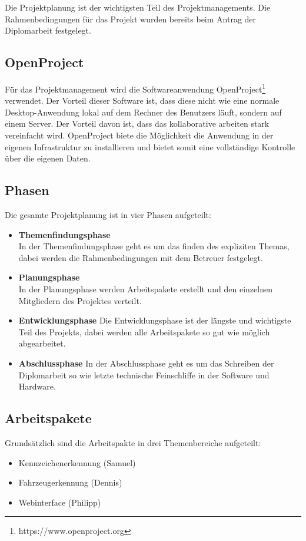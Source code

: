 Die Projektplanung ist der wichtigsten Teil des Projektmanagements. Die
Rahmenbedingungen für das Projekt wurden bereits beim Antrag der Diplomarbeit
festgelegt.

\subsection{OpenProject}
Für das Projektmanagement wird die Softwareanwendung
OpenProject\footnote{https://www.openproject.org} verwendet. Der Vorteil dieser
Software ist, dass diese nicht wie eine normale Desktop-Anwendung lokal auf dem
Rechner des Benutzers läuft, sondern auf einem Server. Der Vorteil davon ist,
dass das kollaborative arbeiten stark vereinfacht wird. OpenProject biete die
Möglichkeit die Anwendung in der eigenen Infrastruktur zu installieren und
bietet somit eine vollständige Kontrolle über die eigenen Daten.

\subsection{Phasen}
Die gesamte Projektplanung ist in vier Phasen aufgeteilt:

\begin{itemize}
  \item \textbf{Themenfindungsphase}\\
  In der Themenfindungsphase geht es um das finden des expliziten Themas, dabei
  werden die Rahmenbedingungen mit dem Betreuer festgelegt.
  \item \textbf{Planungsphase}\\
  In der Planungsphase werden Arbeitspakete erstellt und den einzelnen
  Mitgliedern des Projektes verteilt.
  \item \textbf{Entwicklungsphase}
  Die Entwicklungsphase ist der längste und wichtigste Teil des Projekts, dabei
  werden alle Arbeitspakete so gut wie möglich abgearbeitet.
  \item \textbf{Abschlussphase}
  In der Abschlussphase geht es um das Schreiben der Diplomarbeit so wie letzte
  technische Feinschliffe in der Software und Hardware.
\end{itemize}
\subsection{Arbeitspakete}
Grundsätzlich sind die Arbeitspakte in drei Themenbereiche aufgeteilt:

\begin{itemize}
  \item Kennzeichenerkennung (Samuel)
  \item Fahrzeugerkennung (Dennis)
  \item Webinterface (Philipp)
\end{itemize}

